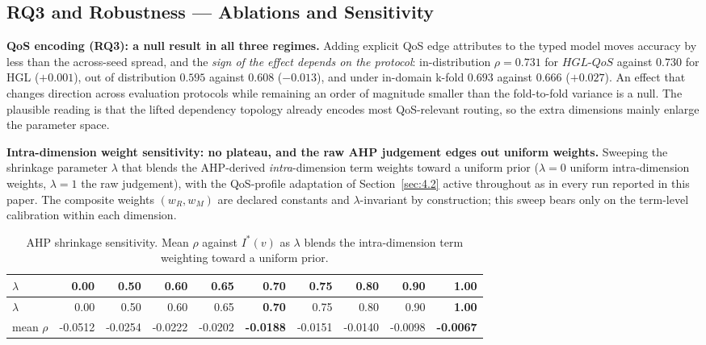 \hypertarget{rq3-and-robustness-ablations-and-sensitivity}{%
\subsection{RQ3 and Robustness --- Ablations and Sensitivity}\label{rq3-and-robustness-ablations-and-sensitivity}}

\label{sec:8.3}

\textbf{QoS encoding (RQ3): a null result in all three regimes.} Adding explicit QoS edge attributes
to the typed model moves accuracy by less than the across-seed spread, and the \emph{sign of the
effect depends on the protocol}: in-distribution \(\rho=0.731\) for \(HGL\text{-}QoS\) against
\(0.730\) for HGL (\(+0.001\)), out of distribution \(0.595\) against \(0.608\) (\(-0.013\)), and
under in-domain k-fold \(0.693\) against \(0.666\) (\(+0.027\)). An effect that changes direction
across evaluation protocols while remaining an order of magnitude smaller than the fold-to-fold
variance is a null. The plausible reading is that the lifted dependency topology already encodes most
QoS-relevant routing, so the extra dimensions mainly enlarge the parameter space.

\textbf{Intra-dimension weight sensitivity: no plateau, and the raw AHP judgement edges out uniform
weights.} Sweeping the shrinkage parameter \(\lambda\) that blends the AHP-derived
\emph{intra}-dimension term weights toward a uniform prior (\(\lambda=0\) uniform intra-dimension
weights, \(\lambda=1\) the raw judgement), with the QoS-profile adaptation of Section~\ref{sec:4.2}
active throughout as in every run reported in this paper. The composite weights \((w_R, w_M)\) are
declared constants and \(\lambda\)-invariant by construction; this sweep bears only on the term-level
calibration within each dimension.

\begin{longtable}[]{@{}lrrrrrrrrr@{}}
\caption{AHP shrinkage sensitivity. Mean \(\rho\) against \(I^*(v)\) as \(\lambda\) blends the intra-dimension term weighting toward a uniform prior.\label{tab:11}}\tabularnewline
\toprule
\(\lambda\) & 0.00 & 0.50 & 0.60 & 0.65 & \textbf{0.70} & 0.75 & 0.80 & 0.90 & \textbf{1.00} \\
\midrule
\endfirsthead
\toprule
\(\lambda\) & 0.00 & 0.50 & 0.60 & 0.65 & \textbf{0.70} & 0.75 & 0.80 & 0.90 & \textbf{1.00} \\
\midrule
\endhead
mean \(\rho\) & -0.0512 & -0.0254 & -0.0222 & -0.0202 & \textbf{-0.0188} & -0.0151 & -0.0140 & -0.0098 & \textbf{-0.0067} \\
\bottomrule
\end{longtable}


